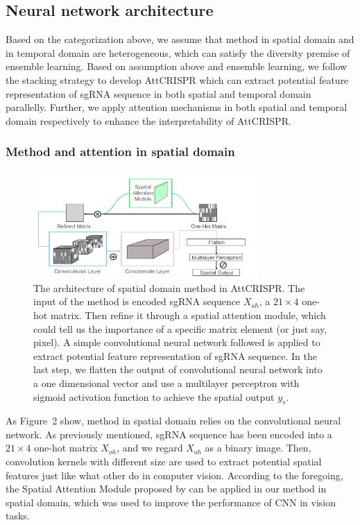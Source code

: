 \documentclass{bioinfo}
\begin{document}
\subsection{Neural network architecture}

Based on the categorization above, we assume that method in spatial domain and in temporal domain are heterogeneous, 
which can satisfy the diversity premise of ensemble learning. 
Based on assumption above and ensemble learning, we follow the stacking strategy to develop AttCRISPR 
which can extract potential feature representation of sgRNA sequence in both spatial and temporal domain parallelly. 
Further, we apply attention mechanisms in both spatial and temporal domain respectively to enhance the interpretability of AttCRISPR.

\subsubsection{Method and attention in spatial domain}

\begin{figure}[!tpb]%
    \centerline{\includegraphics[width=86mm]{CNNv2.png}}
    \caption{The architecture of spatial domain method in AttCRISPR. 
    The input of the method is encoded sgRNA sequence $X_{oh}$, a $21\times 4$ one-hot matrix. 
    Then refine it through a spatial attention module, which could tell us the importance of a specific matrix element (or just say, pixel).
    A simple convolutional neural network followed is applied to extract potential feature representation of sgRNA sequence.
    In the last step, we flatten the output of convolutional neural network into a one dimensional vector and 
    use a multilayer perceptron with sigmoid activation function to achieve the spatial output $y_s$.}\label{fig:02}
\end{figure}
As Figure~2\vphantom{\ref{fig:02}} show, method in spatial domain relies on the convolutional neural network. 
As previously mentioned, sgRNA sequence has been encoded into a $21\times 4$ one-hot matrix $X_{oh}$, and we regard $X_{oh}$ as a binary image. 
Then, convolution kernels with different size are used to extract potential spatial features just like what other do in computer vision. 
According to the foregoing, the Spatial Attention Module proposed by \citeauthor{woo2018cbam:} can be applied in our method in spatial domain, 
which was used to improve the performance of CNN in vision tasks.
\end{document}
